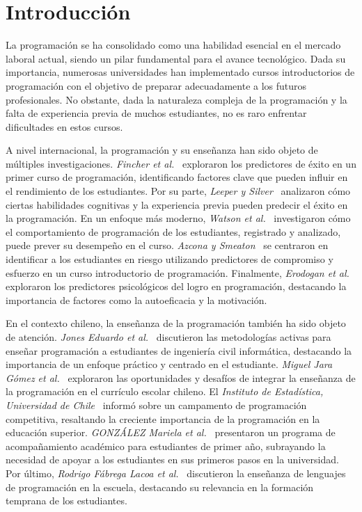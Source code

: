 \hypertarget{Introducción}{%
\section{Introducción}\label{Introducción}}

La programación se ha consolidado como una habilidad esencial en el mercado laboral actual, siendo un pilar fundamental para el avance tecnológico. Dada su importancia, numerosas universidades han implementado cursos introductorios de programación con el objetivo de preparar adecuadamente a los futuros profesionales. No obstante, dada la naturaleza compleja de la programación y la falta de experiencia previa de muchos estudiantes, no es raro enfrentar dificultades en estos cursos.

A nivel internacional, la programación y su enseñanza han sido objeto de múltiples investigaciones. \textit{Fincher et al.}~\cite{fincher2006predictors} exploraron los predictores de éxito en un primer curso de programación, identificando factores clave que pueden influir en el rendimiento de los estudiantes. Por su parte, \textit{Leeper y Silver}~\cite{leeper1982predicting} analizaron cómo ciertas habilidades cognitivas y la experiencia previa pueden predecir el éxito en la programación. En un enfoque más moderno, \textit{Watson et al.}~\cite{watson2013predicting} investigaron cómo el comportamiento de programación de los estudiantes, registrado y analizado, puede prever su desempeño en el curso. \textit{Azcona y Smeaton}~\cite{azcona2017targeting} se centraron en identificar a los estudiantes en riesgo utilizando predictores de compromiso y esfuerzo en un curso introductorio de programación. Finalmente, \textit{Erodogan et al.}~\cite{erodogan2008exploring} exploraron los predictores psicológicos del logro en programación, destacando la importancia de factores como la autoeficacia y la motivación.

En el contexto chileno, la enseñanza de la programación también ha sido objeto de atención. \textit{Jones Eduardo et al.}~\cite{metodologias2022activas} discutieron las metodologías activas para enseñar programación a estudiantes de ingeniería civil informática, destacando la importancia de un enfoque práctico y centrado en el estudiante. \textit{Miguel Jara Gómez et al.}~\cite{oportunidades2017integrar} exploraron las oportunidades y desafíos de integrar la enseñanza de la programación en el currículo escolar chileno. El \textit{Instituto de Estadística, Universidad de Chile}~\cite{campamento2023programacion} informó sobre un campamento de programación competitiva, resaltando la creciente importancia de la programación en la educación superior. \textit{GONZÁLEZ Mariela et al.}~\cite{programa2022acompanamiento} presentaron un programa de acompañamiento académico para estudiantes de primer año, subrayando la necesidad de apoyar a los estudiantes en sus primeros pasos en la universidad. Por último, \textit{Rodrigo Fábrega Lacoa et al.}~\cite{ensenanza2016lenguajes} discutieron la enseñanza de lenguajes de programación en la escuela, destacando su relevancia en la formación temprana de los estudiantes.


